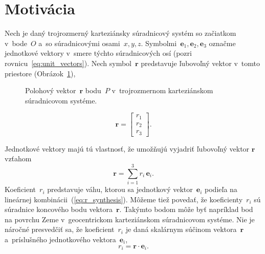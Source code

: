 \documentclass[a4paper, 12pt]{book}
\let\vec\mathbf
\begin{document}
\section{Motivácia}
\label{sec:sh_motivation}

Nech je daný trojrozmerný karteziánsky súradnicový systém so začiatkom 
v~bode~$O$ a~so súradnicovými osami~$x, y, z$.  Symbolmi~$\vec e_1, \vec e_2, 
\vec e_3$ označme jednotkové vektory v~smere týchto súradnicových osí (pozri 
rovnicu~\ref{eq:unit_vectors}).  Nech symbol~$\vec r$ predstavuje ľubovoľný 
vektor v~tomto priestore (Obrázok~\ref{fig:unit_vectors}),
%
\begin{figure}
\centering

\caption{Polohový vektor~$\vec r$ bodu~$P$ v~trojrozmernom karteziánskom 
súradnicovom systéme.}
\label{fig:unit_vectors}
\end{figure}

\begin{equation}
\vec r =
\begin{bmatrix}
r_1\\
r_2\\
r_3
\end{bmatrix}
{.}
\end{equation}

Jednotkové vektory majú tú vlastnosť, že umožňujú vyjadriť ľubovoľný vektor
$\vec r$ vzťahom
%
\begin{equation}
\label{eq:r_synthesis}
\vec r = \sum_{i = 1}^3 r_i \, \vec e_i{.}
\end{equation}
%
Koeficient~$r_i$ predstavuje váhu, ktorou sa jednotkový vektor~$\vec e_i$ 
podieľa na lineárnej kombinácii~(\ref{eq:r_synthesis}).  Môžeme tiež povedať, 
že koeficienty~$r_i$ sú súradnice koncového bodu vektora~$\vec r$.  Takýmto 
bodom môže byť napríklad bod na povrchu Zeme v~geocentrickom karteziánskom 
súradnicovom systéme.  Nie je náročné presvedčiť sa, že koeficient~$r_i$ je 
daná skalárnym súčinom vektora~$\vec r$ a~príslušného jednotkového 
vektora~$\vec e_i$,
%
\begin{equation}
\label{eq:r_analysis}
r_i = \vec r \cdot \vec e_i{.}
\end{equation}
\end{document}

